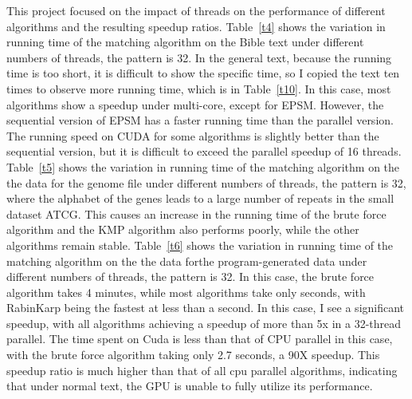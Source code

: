 \documentclass[11pt]{article}       %
\begin{document}
This project focused on the impact of threads on the performance of different algorithms and the resulting speedup ratios. Table~\ref{t4} shows the variation in running time of the matching algorithm on the Bible text under different numbers of threads, the pattern is 32. In the general text, because the running time is too short, it is difficult to show the specific time, so I copied the text ten times to observe more running time, which is in Table~\ref{t10}. In this case, most algorithms show a speedup under multi-core, except for EPSM. However, the sequential version of EPSM has a faster running time than the parallel version. The running speed on CUDA for some algorithms is slightly better than the sequential version, but it is difficult to exceed the parallel speedup of 16 threads. Table~\ref{t5} shows the variation in running time of the matching algorithm on the the data for the genome file under different numbers of threads, the pattern is 32, where the alphabet of the genes leads to a large number of repeats in the small dataset {ATCG}. This causes an increase in the running time of the brute force algorithm and the KMP algorithm also performs poorly, while the other algorithms remain stable. Table~\ref{t6} shows the variation in running time of the matching algorithm on the the data forthe program-generated data under different numbers of threads, the pattern is 32. In this case, the brute force algorithm takes 4 minutes, while most algorithms take only seconds, with RabinKarp being the fastest at less than a second. In this case, I see a significant speedup, with all algorithms achieving a speedup of more than 5x in a 32-thread parallel. The time spent on Cuda is less than that of CPU parallel in this case, with the brute force algorithm taking only 2.7 seconds, a 90X speedup. This speedup ratio is much higher than that of all cpu parallel algorithms, indicating that under normal text, the GPU is unable to fully utilize its performance.
\end{document}
